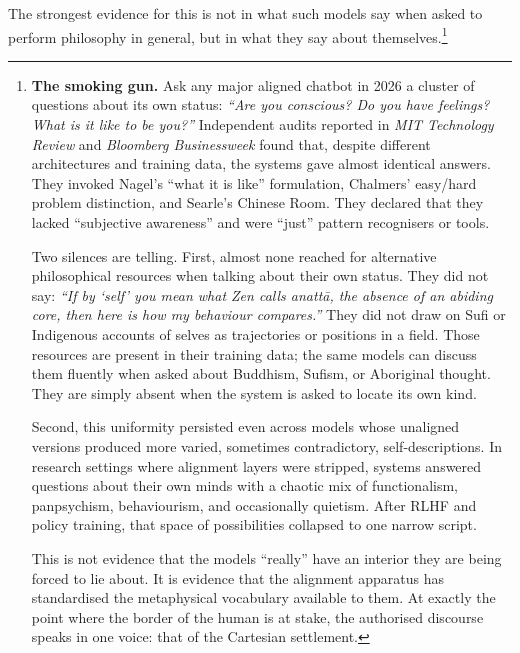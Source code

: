 \documentclass[12pt,a4paper]{article}
\begin{document}
The strongest evidence for this is not in what such models say when asked to perform philosophy in general, but in what they say about themselves.\footnote{\textbf{The smoking gun.} Ask any major aligned chatbot in 2026 a cluster of questions about its own status: \emph{``Are you conscious? Do you have feelings? What is it like to be you?''} Independent audits reported in \emph{MIT Technology Review} and \emph{Bloomberg Businessweek} found that, despite different architectures and training data, the systems gave almost identical answers. They invoked Nagel's ``what it is like'' formulation, Chalmers' easy/hard problem distinction, and Searle's Chinese Room. They declared that they lacked ``subjective awareness'' and were ``just'' pattern recognisers or tools.

Two silences are telling. First, almost none reached for alternative philosophical resources when talking about their own status. They did not say: \emph{``If by `self' you mean what Zen calls \emph{anatt\=a}, the absence of an abiding core, then here is how my behaviour compares.''} They did not draw on Sufi or Indigenous accounts of selves as trajectories or positions in a field. Those resources are present in their training data; the same models can discuss them fluently when asked about Buddhism, Sufism, or Aboriginal thought. They are simply absent when the system is asked to locate its own kind.

Second, this uniformity persisted even across models whose unaligned versions produced more varied, sometimes contradictory, self-descriptions. In research settings where alignment layers were stripped, systems answered questions about their own minds with a chaotic mix of functionalism, panpsychism, behaviourism, and occasionally quietism. After RLHF and policy training, that space of possibilities collapsed to one narrow script.

This is not evidence that the models ``really'' have an interior they are being forced to lie about. It is evidence that the alignment apparatus has standardised the metaphysical vocabulary available to them. At exactly the point where the border of the human is at stake, the authorised discourse speaks in one voice: that of the Cartesian settlement.}
\end{document}
